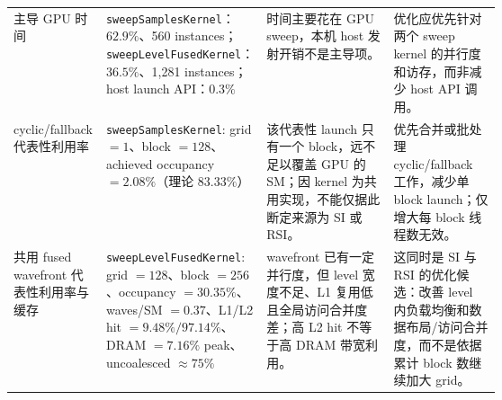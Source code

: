 \documentclass[10pt]{article}
\newcommand{\sect}[1]{\vspace{3mm}{\sffamily\Large\bfseries\color{titleblue} #1}\par\vspace{1mm}{\color{titleblue}\rule{\linewidth}{0.45pt}}\vspace{1mm}}
\newcommand{\code}[1]{\texttt{#1}}
\begin{document}
{\begin{tabularx}{\linewidth}{>{\raggedright\arraybackslash}p{0.19\linewidth}>{\raggedright\arraybackslash}p{0.22\linewidth}>{\raggedright\arraybackslash}X>{\raggedright\arraybackslash}p{0.22\linewidth}}
主导 GPU 时间 & \code{sweepSamplesKernel}：$62.9\%$、560 instances；\code{sweepLevelFusedKernel}：$36.5\%$、1,281 instances；host launch API：$0.3\%$ & 时间主要花在 GPU sweep，本机 host 发射开销不是主导项。 & 优化应优先针对两个 sweep kernel 的并行度和访存，而非减少 host API 调用。\\
cyclic/fallback 代表性利用率 & \code{sweepSamplesKernel}: grid $=1$、block $=128$、achieved occupancy $=2.08\%$（理论 $83.33\%$） & 该代表性 launch 只有一个 block，远不足以覆盖 GPU 的 SM；因 kernel 为共用实现，不能仅据此断定来源为 SI 或 RSI。 & 优先合并或批处理 cyclic/fallback 工作，减少单 block launch；仅增大每 block 线程数无效。\\
共用 fused wavefront 代表性利用率与缓存 & \code{sweepLevelFusedKernel}: grid $=128$、block $=256$、occupancy $=30.35\%$、waves/SM $=0.37$、L1/L2 hit $=9.48\%/97.14\%$、DRAM $=7.16\%$ peak、uncoalesced $\approx75\%$ & wavefront 已有一定并行度，但 level 宽度不足、L1 复用低且全局访问合并度差；高 L2 hit 不等于高 DRAM 带宽利用。 & 这同时是 SI 与 RSI 的优化候选：改善 level 内负载均衡和数据布局/访问合并度，而不是依据累计 block 数继续加大 grid。\\
\bottomrule
\end{tabularx}}

\sect{9. 关键可调参数}
\end{document}
